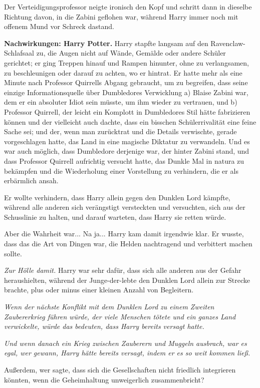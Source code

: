 Der Verteidigungsprofessor neigte ironisch den Kopf und schritt dann in dieselbe
Richtung davon, in die Zabini geflohen war, während Harry immer noch mit offenem
Mund vor Schreck dastand.

\textbf{Nachwirkungen: Harry Potter.}
Harry stapfte langsam auf den Ravenclaw-Schlafsaal zu, die Augen nicht auf
Wände, Gemälde oder andere Schüler gerichtet; er ging Treppen hinauf und Rampen
hinunter, ohne zu verlangsamen, zu beschleunigen oder darauf zu achten, wo er
hintrat. Er hatte mehr als eine Minute nach Professor Quirrells Abgang
gebraucht, um zu begreifen, dass seine einzige Informationsquelle über
Dumbledores Verwicklung a) Blaise Zabini war, dem er ein absoluter Idiot sein
müsste, um ihm wieder zu vertrauen, und b) Professor Quirrell, der leicht ein
Komplott in Dumbledores Stil hätte fabrizieren können und der vielleicht auch
dachte, dass ein bisschen Schülerrivalität eine feine Sache sei; und der, wenn
man zurücktrat und die Details verwischte, gerade vorgeschlagen hatte, das Land
in eine magische Diktatur zu verwandeln. Und es war auch möglich, dass
Dumbledore derjenige war, der hinter Zabini stand, und dass Professor Quirrell
aufrichtig versucht hatte, das Dunkle Mal in natura zu bekämpfen und die
Wiederholung einer Vorstellung zu verhindern, die er als erbärmlich ansah.

Er wollte verhindern, dass Harry allein gegen den Dunklen Lord kämpfte, während
alle anderen sich verängstigt versteckten und versuchten, sich aus der
Schusslinie zu halten, und darauf warteten, dass Harry sie retten würde.

Aber die Wahrheit war... Na ja... Harry kam damit irgendwie klar. Er wusste,
dass das die Art von Dingen war, die Helden nachtragend und verbittert machen
sollte.

\emph{Zur Hölle damit.} Harry war sehr dafür, dass sich alle anderen aus der
Gefahr heraushielten, während der Junge-der-lebte den Dunklen Lord allein zur
Strecke brachte, plus oder minus einer kleinen Anzahl von Begleitern.

\emph{Wenn der nächste Konflikt mit dem Dunklen Lord zu einem Zweiten
Zaubererkrieg führen würde, der viele Menschen tötete und ein ganzes Land
verwickelte, würde das bedeuten, dass Harry bereits versagt hatte.}

\emph{Und wenn danach ein Krieg zwischen Zauberern und Muggeln ausbrach, war es
egal, wer gewann, Harry hätte bereits versagt, indem er es so weit kommen ließ.}

Außerdem, wer sagte, dass sich die Gesellschaften nicht friedlich integrieren
könnten, wenn die Geheimhaltung unweigerlich zusammenbricht?

